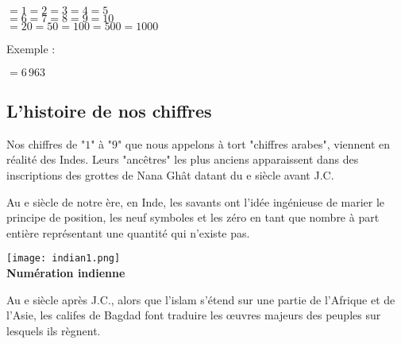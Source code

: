 \begin{pageCours}
\begin{His}
\begin{center}
$=1$\hspace{.5cm}$=2$\hspace{.5cm}$=3$\hspace{.5cm}$=4$\hspace{.5cm}$=5$\\
$=6$\hspace{.5cm}$=7$\hspace{.5cm}$=8$\hspace{.5cm}$=9$\hspace{.5cm}$=10$\\
$=20$\hspace{.5cm}$=50$\hspace{.5cm}$=100$\hspace{.5cm}$=500$\hspace{.5cm}$=1000$
\end{center}

Exemple :
\begin{center}
$=6\,963$
\end{center}
\end{His}

\subsection{L'histoire de nos chiffres}

\begin{His}
Nos chiffres de "$1$" à "$9$" que nous appelons à tort "chiffres arabes", viennent en réalité des Indes. Leurs "ancêtres" les plus anciens apparaissent dans des inscriptions des grottes de Nana Ghât datant du e siècle avant J.C.

Au e siècle de notre ère, en Inde, les savants ont l'idée ingénieuse de marier le principe de position, les neuf symboles et les zéro en tant que nombre à part entière représentant une quantité qui n'existe pas.

\begin{center}
\texttt{[image: indian1.png]}\\
\textbf{Numération indienne}
\end{center}

Au e siècle après J.C., alors que l'islam s'étend sur une partie de l'Afrique et de l'Asie, les califes de Bagdad font traduire les œuvres majeurs des peuples sur lesquels ils règnent.


\end{His}
\end{pageCours}
